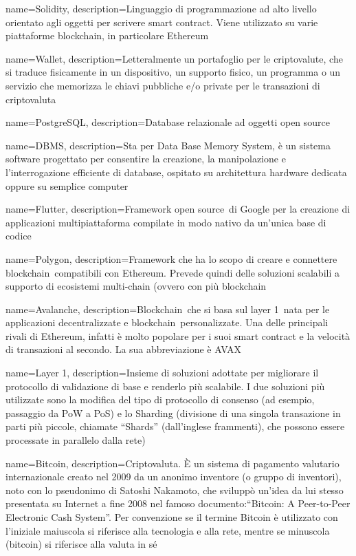 {
	name={Solidity},
	description={Linguaggio di programmazione ad alto livello orientato agli oggetti per scrivere smart contract. Viene utilizzato su varie piattaforme blockchain\glo , in particolare Ethereum}
}

{
	name={Wallet},
	description={Letteralmente un portafoglio per le criptovalute\glo , che si traduce fisicamente in un dispositivo, un supporto fisico, un programma o un servizio che memorizza le chiavi pubbliche e/o private per le transazioni di criptovaluta\glo}
}	

{
	name={PostgreSQL},
	description={Database relazionale ad oggetti open source\glo}
}

{
	name={DBMS},
	description={Sta per Data Base Memory System, è un sistema software progettato per consentire la creazione, la manipolazione e l'interrogazione efficiente di database, ospitato su architettura hardware dedicata oppure su semplice computer}
}

{
	name={Flutter},
	description={Framework open source\glo\ di Google per la creazione di applicazioni multipiattaforma compilate in modo nativo da un’unica base di codice}
}

{
	name={Polygon},
	description={Framework che ha lo scopo di creare e connettere blockchain\glo\ compatibili con Ethereum. Prevede quindi delle soluzioni scalabili a supporto di ecosistemi multi-chain (ovvero con più blockchain\glo\)}
}

{
	name={Avalanche},
	description={Blockchain\glo\ che si basa sul layer 1\glo\ nata per le applicazioni decentralizzate e blockchain\glo\ personalizzate. Una delle principali rivali di Ethereum, infatti è molto popolare per i suoi smart contract e la velocità di transazioni al secondo. La sua abbreviazione è AVAX}
}

{
	name={Layer 1},
	description={Insieme di soluzioni adottate per migliorare il protocollo di validazione di base e renderlo più scalabile. I due soluzioni più utilizzate sono la modifica del tipo di protocollo di consenso (ad esempio, passaggio da PoW a PoS) e lo Sharding (divisione di una singola transazione in parti più piccole, chiamate “Shards” (dall’inglese frammenti), che possono essere processate in parallelo dalla rete)}
}

{
	name={Bitcoin},
	description={Criptovaluta\glo. È un sistema di pagamento valutario internazionale creato nel 2009 da un anonimo inventore (o gruppo di inventori), noto con lo pseudonimo di Satoshi Nakamoto, che sviluppò un'idea da lui stesso presentata su Internet a fine 2008 nel famoso documento:“Bitcoin: A Peer-to-Peer Electronic Cash System”. Per convenzione se il termine Bitcoin è utilizzato con l'iniziale maiuscola si riferisce alla tecnologia e alla rete, mentre se minuscola (bitcoin) si riferisce alla valuta in sé}
}

